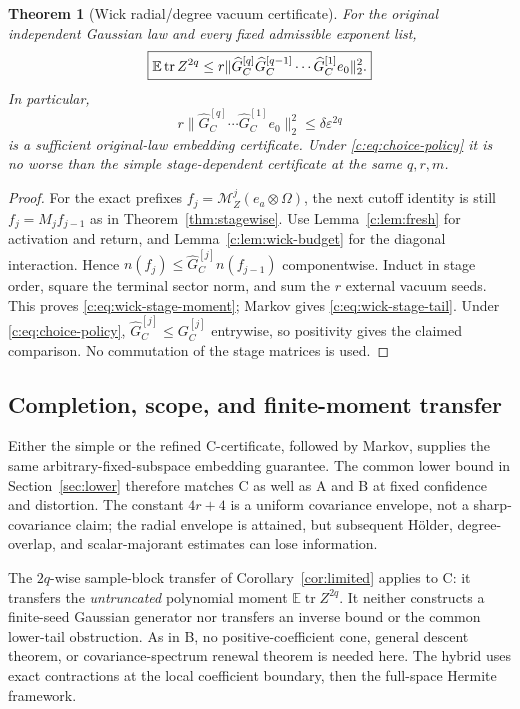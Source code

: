 \documentclass[11pt]{article}
\numberwithin{equation}{section}
\newtheorem{theorem}{Theorem}[section]
\theoremstyle{definition}\newtheorem{definition}[theorem]{Definition}
\theoremstyle{remark}\newtheorem{remark}[theorem]{Remark}
\newcommand{\tr}{\operatorname{tr}}\newcommand{\Ent}{\operatorname{Ent}}
\newcommand{\norm}[1]{\lVert#1\rVert}\newcommand{\ip}[2]{\langle#1,#2\rangle}
\begin{document}
\begin{theorem}[Wick radial/degree vacuum certificate]\label{c:thm:wick-refined}
For the original independent Gaussian law and every fixed admissible exponent list,
\begin{equation}\label{c:eq:wick-stage-moment}
 \boxed{\E\tr Z^{2q}\le
 r\norm{\widehat G_C^{[q]}\widehat G_C^{[q-1]}\cdots\widehat G_C^{[1]}e_0}_2^2.}
\end{equation}
In particular,
\begin{equation}\label{c:eq:wick-stage-tail}
 r\norm{\widehat G_C^{[q]}\cdots\widehat G_C^{[1]}e_0}_2^2
 \le\delta\varepsilon^{2q}
\end{equation}
is a sufficient original-law embedding certificate. Under \eqref{c:eq:choice-policy}
it is no worse than the simple stage-dependent certificate at the same $q,r,m$.
\end{theorem}
\begin{proof}
For the exact prefixes $f_j=\mathcal M_Z^j(e_a\otimes\Omega)$, the next cutoff
identity is still $f_j=M_jf_{j-1}$ as in Theorem~\ref{thm:stagewise}.
Use Lemma~\ref{c:lem:fresh} for activation and return, and
Lemma~\ref{c:lem:wick-budget} for the diagonal interaction. Hence
$n(f_j)\le\widehat G_C^{[j]}n(f_{j-1})$ componentwise. Induct in stage order,
square the terminal sector norm, and sum the $r$ external vacuum seeds.
This proves \eqref{c:eq:wick-stage-moment}; Markov gives
\eqref{c:eq:wick-stage-tail}. Under \eqref{c:eq:choice-policy},
$\widehat G_C^{[j]}\le G_C^{[j]}$ entrywise, so positivity gives the claimed
comparison. No commutation of the stage matrices is used.
\end{proof}

\subsection{Completion, scope, and finite-moment transfer}
Either the simple or the refined C-certificate, followed by Markov, supplies
the same arbitrary-fixed-subspace embedding guarantee. The common lower bound
in Section~\ref{sec:lower} therefore matches C as well as A and B at fixed
confidence and distortion. The constant $4r+4$ is a uniform covariance envelope,
not a sharp-covariance claim; the radial envelope is attained, but subsequent
H\"older, degree-overlap, and scalar-majorant estimates can lose information.

The $2q$-wise sample-block transfer of Corollary~\ref{cor:limited} applies to C:
it transfers the \emph{untruncated} polynomial moment
$\mathbb E\tr Z^{2q}$. It neither constructs a finite-seed Gaussian generator nor
transfers an inverse bound or the common lower-tail obstruction. As in B,
no positive-coefficient cone, general descent theorem, or covariance-spectrum
renewal theorem is needed here. The hybrid uses exact contractions at the
local coefficient boundary, then the full-space Hermite framework.
\end{document}
